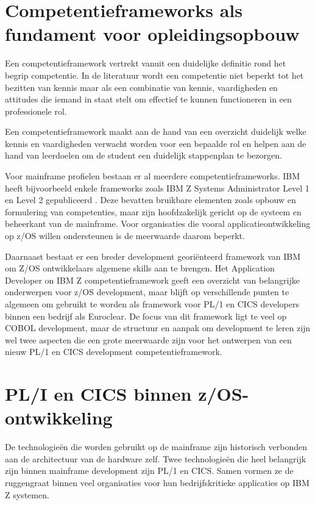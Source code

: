 \section{Competentieframeworks als fundament voor opleidingsopbouw}%
\label{sec:competentieframeworks}


Een competentieframework vertrekt vanuit een duidelijke definitie rond het begrip competentie.
In de literatuur wordt een competentie niet beperkt tot het bezitten van kennis maar als een combinatie van kennis,
vaardigheden en attitudes die iemand in staat stelt om effectief te kunnen functioneren in een professionele rol.

Een competentieframework maakt aan de hand van een overzicht duidelijk welke kennis en vaardigheden verwacht worden voor een bepaalde rol en helpen aan de hand van leerdoelen om de student een duidelijk stappenplan te bezorgen.

Voor mainframe profielen bestaan er al meerdere competentieframeworks.
IBM heeft bijvoorbeeld enkele frameworks zoals IBM Z Systems Administrator Level 1 en Level 2 gepubliceerd \autocite{ibm_z_sysadmin_level1,ibm_z_sysadmin_level2}.
Deze bevatten bruikbare elementen zoals opbouw en formulering van competenties, maar zijn hoofdzakelijk gericht op de systeem en beheerkant van de mainframe. 
Voor organisaties die vooral applicatieontwikkeling op z/OS willen ondersteunen is de meerwaarde daarom beperkt.

Daarnaast bestaat er een breder development georiënteerd framework van IBM om Z/OS ontwikkelaars algemene skills aan te brengen.
Het Application Developer on IBM Z competentieframework \autocite{ibm_app_dev_z_2023} geeft een overzicht van belangrijke onderwerpen voor z/OS development, maar blijft op verschillende punten te algemeen om gebruikt te worden als framework voor PL/1 en CICS developers binnen een bedrijf als Euroclear.
De focus van dit framework ligt te veel op COBOL development, maar de structuur en aanpak om development te leren zijn wel twee aspecten die een grote meerwaarde zijn voor het ontwerpen van een nieuw PL/1 en CICS development competentieframework.

\section{PL/I en CICS binnen z/OS-ontwikkeling}%
\label{sec:pli_cics_zos} 

De technologieën die worden gebruikt op de mainframe zijn historisch verbonden aan de architectuur van de hardware zelf.
Twee technologieën die heel belangrijk zijn binnen mainframe development zijn PL/1 en CICS.
Samen vormen ze de ruggengraat binnen veel organisaties voor hun bedrijfskritieke applicaties op IBM Z systemen. 

